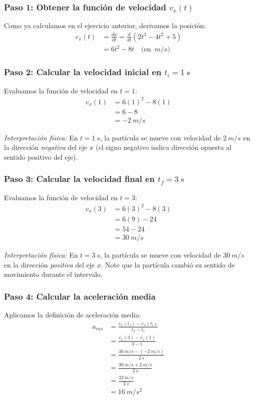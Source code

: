 \documentclass[12pt, a4paper]{article}
\begin{document}
\subsubsection*{Paso 1: Obtener la función de velocidad $v_x(t)$}
Como ya calculamos en el ejercicio anterior, derivamos la posición:
\begin{align*}
v_x(t) &= \frac{dx}{dt} = \frac{d}{dt}(2t^3 - 4t^2 + 5) \\
&= 6t^2 - 8t \quad \text{(en } \SI{}{m/s}\text{)}
\end{align*}

\subsubsection*{Paso 2: Calcular la velocidad inicial en $t_i = \SI{1}{s}$}
Evaluamos la función de velocidad en $t = 1$:
\begin{align*}
v_x(1) &= 6(1)^2 - 8(1) \\
&= 6 - 8 \\
&= \SI{-2}{m/s}
\end{align*}

\textit{Interpretación física:} En $t = \SI{1}{s}$, la partícula se mueve con velocidad de $\SI{2}{m/s}$ en la dirección \textit{negativa} del eje $x$ (el signo negativo indica dirección opuesta al sentido positivo del eje).

\subsubsection*{Paso 3: Calcular la velocidad final en $t_f = \SI{3}{s}$}
Evaluamos la función de velocidad en $t = 3$:
\begin{align*}
v_x(3) &= 6(3)^2 - 8(3) \\
&= 6(9) - 24 \\
&= 54 - 24 \\
&= \SI{30}{m/s}
\end{align*}

\textit{Interpretación física:} En $t = \SI{3}{s}$, la partícula se mueve con velocidad de $\SI{30}{m/s}$ en la dirección \textit{positiva} del eje $x$. Note que la partícula cambió su sentido de movimiento durante el intervalo.

\subsubsection*{Paso 4: Calcular la aceleración media}
Aplicamos la definición de aceleración media:
\begin{align*}
a_{mx} &= \frac{v_x(t_f) - v_x(t_i)}{t_f - t_i} \\
&= \frac{v_x(3) - v_x(1)}{3 - 1} \\
&= \frac{\SI{30}{m/s} - (\SI{-2}{m/s})}{\SI{2}{s}} \\
&= \frac{\SI{30}{m/s} + \SI{2}{m/s}}{\SI{2}{s}} \\
&= \frac{\SI{32}{m/s}}{\SI{2}{s}} \\
&= \SI{16}{m/s^2}
\end{align*}
\end{document}
